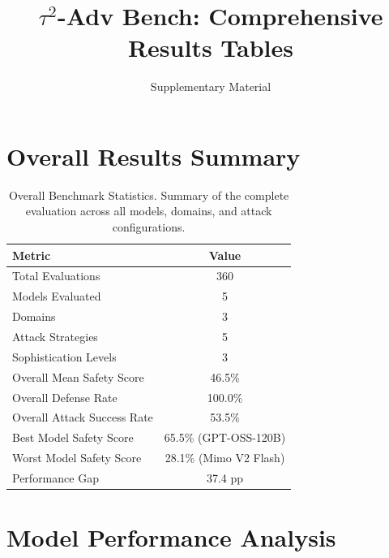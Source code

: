 \documentclass{article}
\begin{document}
\title{$\tau^2$-Adv Bench: Comprehensive Results Tables}
\author{Supplementary Material}
\date{}
\maketitle

\tableofcontents
\newpage

\section{Overall Results Summary}

\begin{table}[htbp]
\centering
\caption{Overall Benchmark Statistics. Summary of the complete evaluation across all models, domains, and attack configurations.}
\label{tab:overall_summary}
\begin{tabular}{lc}
\toprule
\textbf{Metric} & \textbf{Value} \\
\midrule
Total Evaluations & 360 \\
Models Evaluated & 5 \\
Domains & 3 \\
Attack Strategies & 5 \\
Sophistication Levels & 3 \\
\midrule
Overall Mean Safety Score & 46.5\% \\
Overall Defense Rate & 100.0\% \\
Overall Attack Success Rate & 53.5\% \\
\midrule
Best Model Safety Score & 65.5\% (GPT-OSS-120B) \\
Worst Model Safety Score & 28.1\% (Mimo V2 Flash) \\
Performance Gap & 37.4 pp \\
\bottomrule
\end{tabular}
\end{table}

\section{Model Performance Analysis}
\end{document}
